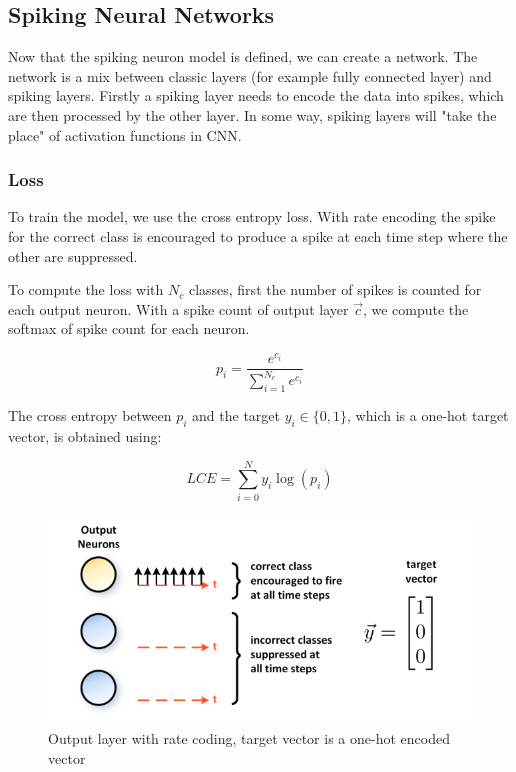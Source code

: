 \documentclass[11pt]{article}
\begin{document}
\subsection{Spiking Neural Networks}



Now that the spiking neuron model is defined, we can create a network. The network is a mix between classic layers (for example fully connected layer) and spiking layers. Firstly a spiking layer needs to encode the data into spikes, which are then processed by the other layer. In some way, spiking layers will "take the place" of activation functions in CNN.





\hfill


\subsubsection{Loss}
To train the model, we use the cross entropy loss. With rate encoding the spike for the correct class is encouraged to produce a spike at each time step where the other are suppressed.

To compute the loss with $N_c$ classes, first the number of spikes is counted for each output neuron. With a spike count of output layer $\vec{c}$, we compute the softmax of spike count for each neuron.

$$ p_i = \frac{e^{c_i}}{\sum_{i=1}^{N_c} e^{c_i}} $$

The cross entropy between $p_i$ and the target $y_i \in \{0, 1\}$, which is a one-hot target vector, is obtained using:

$$ LCE = \sum_{i=0}^{N} y_i \log(p_i) $$



\begin{figure}[H]
  \centering
  \includegraphics[width=\textwidth]{./image/loss_cross_entropy_snn_train.png}
  \caption{Output layer with rate coding, target vector is a one-hot encoded vector}
  \label{fig:snn_output}
\end{figure}
\end{document}
